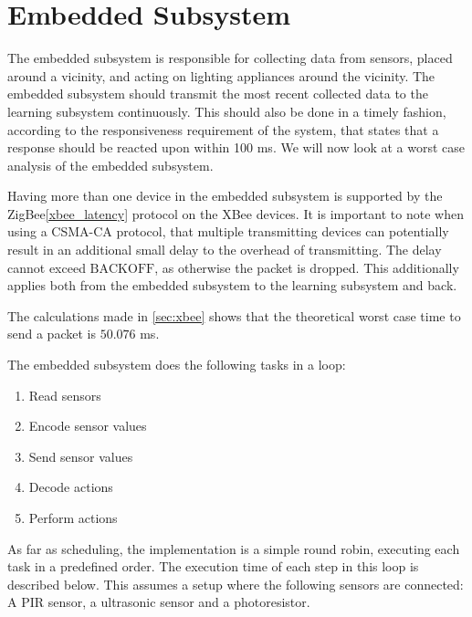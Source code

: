 \section{Embedded Subsystem}\label{sub:sensorStation}

The embedded subsystem is responsible for collecting data from sensors, placed around a vicinity, and acting on lighting appliances around the vicinity. The embedded subsystem should transmit the most recent collected data to the learning subsystem continuously. This should also be done in a timely fashion, according to the responsiveness requirement of the system, that states that a response should be reacted upon within 100 ms. We will now look at a worst case analysis of the embedded subsystem.

Having more than one device in the embedded subsystem is supported by the ZigBee\cref{xbee_latency} protocol on the XBee devices. It is important to note when using a CSMA-CA protocol, that multiple transmitting devices can potentially result in an additional small delay to the overhead of transmitting. The delay cannot exceed $\text{BACKOFF}$, as otherwise the packet is dropped. This additionally applies both from the embedded subsystem to the learning subsystem and back.

The calculations made in \cref{sec:xbee} shows that the theoretical worst case time to send a packet is $50.076$ ms.

The embedded subsystem does the following tasks in a loop:
\begin{enumerate}
  \item Read sensors
  \item Encode sensor values
  \item Send sensor values
  \item Decode actions
  \item Perform actions
\end{enumerate}

As far as scheduling, the implementation is a simple round robin, executing each task in a predefined order. The execution time of each step in this loop is described below. This assumes a setup where the following sensors are connected: A PIR sensor, a ultrasonic sensor and a photoresistor.

